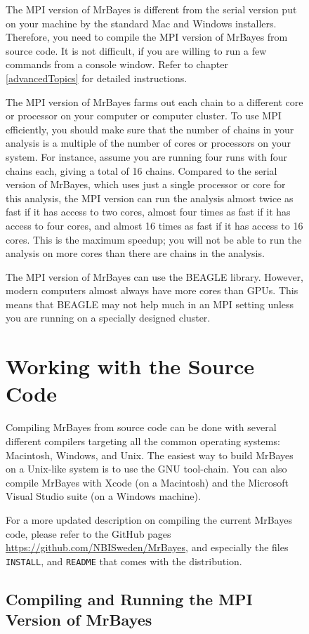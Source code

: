 \documentclass[12pt]{book}
\newcommand{\ttt}[1]{\texttt{#1}}
\begin{document}
\begin{figure}[h]
The MPI version of MrBayes is different from the serial version put on your machine by the standard
Mac and Windows installers. Therefore, you need to compile the MPI version of MrBayes from source
code. It is not difficult, if you are willing to run a few commands from a console window. Refer to
chapter \ref{advancedTopics} for detailed instructions.

The MPI version of MrBayes farms out each chain to a different core or processor on your computer
or computer cluster. To use MPI efficiently, you should make sure that the number of chains in your
analysis is a multiple of the number of cores or processors on your system. For instance, assume
you are running four runs with four chains each, giving a total of 16 chains. Compared to the
serial version of MrBayes, which uses just a single processor or core for this analysis, the MPI
version can run the analysis almost twice as fast if it has access to two cores, almost four times
as fast if it has access to four cores, and almost 16 times as fast if it has access to 16 cores.
This is the maximum speedup; you will not be able to run the analysis on more cores than there are
chains in the analysis.

The MPI version of MrBayes can use the BEAGLE library. However, modern computers almost always have
more cores than GPUs. This means that BEAGLE may not help much in an MPI setting unless you are
running on a specially designed cluster.

\section{Working with the Source Code}

Compiling MrBayes from source code can be done with several different compilers targeting all the
common operating systems: Macintosh, Windows, and Unix. The easiest way to build MrBayes on a
Unix-like system is to use the GNU tool-chain. You can also compile MrBayes with Xcode (on a
Macintosh) and the Microsoft Visual Studio suite (on a Windows machine).

For a more updated description on compiling the current MrBayes code, please refer to the GitHub
pages \url{https://github.com/NBISweden/MrBayes}, and especially the files \ttt{INSTALL}, and
\ttt{README} that comes with the distribution.

\subsection{Compiling and Running the MPI Version of MrBayes}
\label{MPIversion}


\end{figure}
\end{document}
